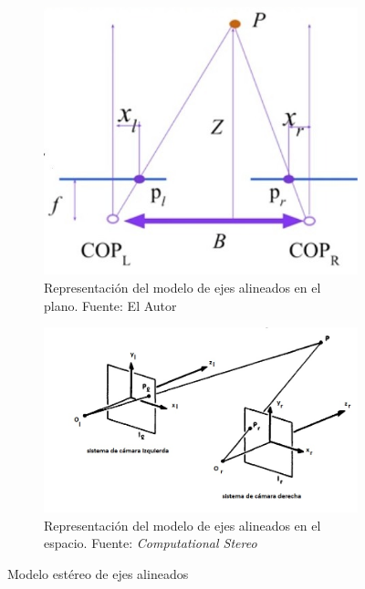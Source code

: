 \begin{figure}[H]
     \centering
     \begin{subfigure}[b]{0.4\textwidth}
        \centering
        \includegraphics[scale=0.4]{Recursos/stereoGeometry.jpg}
        \caption[Representación del modelo de ejes alineados en el plano.]{Representación del modelo de ejes alineados en el plano. {\footnotesize Fuente: El Autor}}
        \label{estereoSystemParallel}
     \end{subfigure}
    \hspace{1em}
     \begin{subfigure}[b]{0.4\textwidth}
         \centering
        \includegraphics[scale=0.5]{Recursos/stereoGeometry3D.jpg}
        \caption[Representación del modelo de ejes alineados en el espacio.]{Representación del modelo de ejes alineados en el espacio. {\footnotesize Fuente: \textit{Computational Stereo} \cite{Barnard1982}}}
        \label{estereoSystemParallel3D}
     \end{subfigure}
     \hfill
\caption{Modelo estéreo de ejes alineados}
\label{stereoMODEL}
\end{figure}
